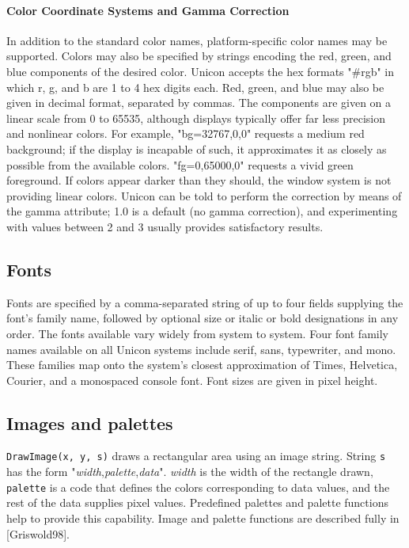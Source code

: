 \paragraph{Color Coordinate Systems and Gamma Correction}
In addition to the standard color names, platform-specific color names
may be supported. Colors may also be specified by strings encoding the
red, green, and blue components of the desired color. Unicon accepts
the hex formats "\#rgb" in which r, g, and b are 1 to 4 hex digits
each. Red, green, and blue may also be given in decimal format,
separated by commas. The components are given on a linear scale from 0
to 65535, although displays typically offer far less precision and
nonlinear colors. For example, "bg=32767,0,0" requests a medium red
background; if the display is incapable of such, it approximates it as
closely as possible from the available colors.  "fg=0,65000,0"
requests a vivid green foreground. If colors appear darker than they
should, the window system is not providing linear colors. Unicon can
be told to perform the correction by means of the gamma attribute; 1.0
is a default (no gamma correction), and experimenting with values
between 2 and 3 usually provides satisfactory results.

\subsection{Fonts}

Fonts are specified by a comma-separated string of up to four fields
supplying the font's family name, followed by optional size or italic
or bold designations in any order. The fonts available vary widely
from system to system. Four font family names available on all Unicon
systems include serif, sans, typewriter, and mono. These families map
onto the system's closest approximation of Times, Helvetica, Courier,
and a monospaced console font. Font sizes are given in pixel height.

\subsection{Images and palettes}

\texttt{DrawImage(x, y, s)} draws a rectangular area using an image
string.  String \texttt{s} has the form
"\textit{width},\textit{palette},\textit{data}".  \textit{width} is
the width of the rectangle drawn, \texttt{palette} is a code that
defines the colors corresponding to data values, and the rest of the
data supplies pixel values. Predefined palettes and palette functions
help to provide this capability. Image and palette functions are
described fully in [Griswold98].

